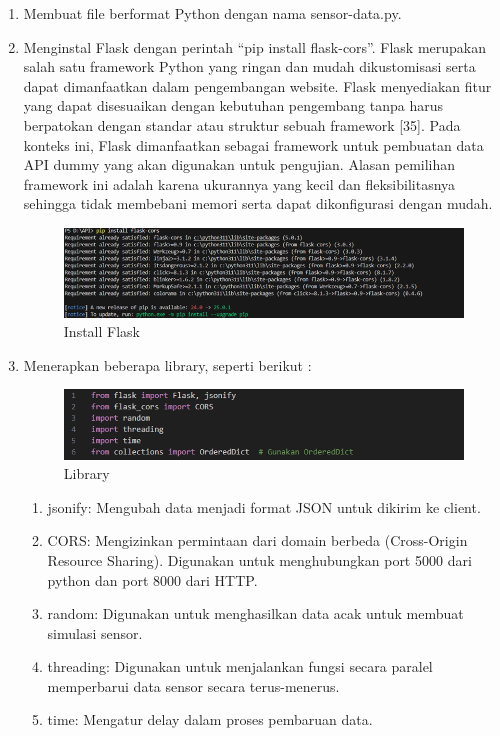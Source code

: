 \begin{enumerate}[label={\alph*.}]
\begin{enumerate}[label={\arabic*.}]
		\item Membuat file berformat Python dengan nama sensor-data.py.
		\item Menginstal Flask dengan perintah “pip install flask-cors”. Flask merupakan salah satu framework Python yang ringan dan mudah dikustomisasi serta dapat dimanfaatkan dalam pengembangan website. Flask menyediakan fitur yang dapat disesuaikan dengan kebutuhan pengembang tanpa harus berpatokan dengan standar atau struktur sebuah framework [35]. Pada konteks ini, Flask dimanfaatkan sebagai framework untuk pembuatan data API dummy yang akan digunakan untuk pengujian. Alasan pemilihan framework ini adalah karena ukurannya yang kecil dan fleksibilitasnya sehingga tidak membebani memori serta dapat dikonfigurasi dengan mudah. 
		\begin{figure}[H]
			\centering
			\includegraphics[width=0.8\linewidth]{gambar/Dasar teori/Flask.png}
			\caption{Install Flask}
			\label{Instal Flask}
		\end{figure}
		
		\item Menerapkan beberapa library, seperti berikut : 
		\begin{figure}[H]
			\centering
			\includegraphics[width=0.8\linewidth]{gambar/Dasar teori/Library.png}
			\caption{Library}
			\label{Menambahkan Library}
		\end{figure}
		\begin{enumerate}[label={\alph*.}]
			\item jsonify: Mengubah data menjadi format JSON untuk dikirim ke client.
			\item CORS: Mengizinkan permintaan dari domain berbeda (Cross-Origin Resource Sharing). Digunakan untuk menghubungkan port 5000 dari python dan port 8000 dari HTTP. 
			\item random: Digunakan untuk menghasilkan data acak untuk membuat simulasi sensor. 
			\item threading: Digunakan untuk menjalankan fungsi secara paralel memperbarui data sensor secara terus-menerus.
			\item time: Mengatur delay dalam proses pembaruan data.
		\end{enumerate}
		

\end{enumerate}
\end{enumerate}

